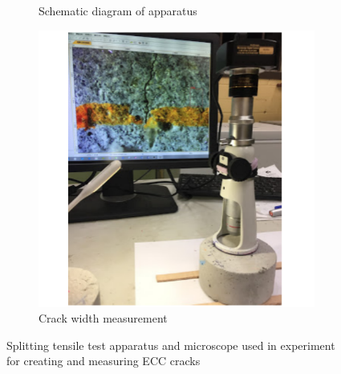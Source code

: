 \documentclass[11pt]{article}
\begin{document}
\begin{figure}[!h]
\begin{subfigure}{0.31\textwidth}
		\caption{Schematic diagram of apparatus}
		\end{subfigure}	
	\hspace{-0.10em}
		\begin{subfigure}{0.31\textwidth}
		\centering
		\includegraphics[width = \linewidth]{CR3}
		\caption{Crack width measurement}
		\end{subfigure}
		\caption{Splitting tensile test apparatus and microscope used in experiment for creating and measuring ECC cracks}\label{f:cr1}
	\end{figure} 


	
\end{document}

